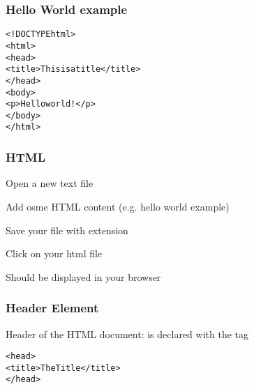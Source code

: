 \documentclass[12pt]{beamer}\usepackage[]{graphicx}\usepackage[]{color}
\makeatletter
\newenvironment{kframe}{%
 \def\at@end@of@kframe{}%
 \ifinner\ifhmode%
  \def\at@end@of@kframe{\end{minipage}}%
  \begin{minipage}{\columnwidth}%
 \fi\fi%
 \def\FrameCommand##1{\hskip\@totalleftmargin \hskip-\fboxsep
 \colorbox{shadecolor}{##1}\hskip-\fboxsep
     \hskip-\linewidth \hskip-\@totalleftmargin \hskip\columnwidth}%
 \MakeFramed {\advance\hsize-\width
   \@totalleftmargin\z@ \linewidth\hsize
   \@setminipage}}%
 {\par\unskip\endMakeFramed%
 \at@end@of@kframe}
\newenvironment{knitrout}{}{} %
\makeatother
\begin{document}

\begin{frame}[fragile]
\frametitle{Hello World example}

\begin{knitrout}\footnotesize
{}\color{fgcolor}\begin{kframe}
\begin{alltt}
<!DOCTYPE html>
<html>
  <head>
    <title>This is a title</title>
  </head>
  <body>
    <p>Hello world!</p>
  </body>
</html>
\end{alltt}
\end{kframe}
\end{knitrout}

\end{frame}


\begin{frame}
\frametitle{HTML}

\bi
 \item Open a new text file
 \item Add osme HTML content (e.g. hello world example)
 \item Save your file with extension 
 \item Click on your html file
 \item Should be displayed in your browser
\ei

\end{frame}


\begin{frame}[fragile]
\frametitle{Header Element}

Header of the HTML document: is declared with the tag {\hilit {}}
\begin{knitrout}\footnotesize
{}\color{fgcolor}\begin{kframe}
\begin{alltt}
<head>
  <title>The Title</title>
</head>
\end{alltt}
\end{kframe}
\end{knitrout}

\end{frame}

\end{document}
